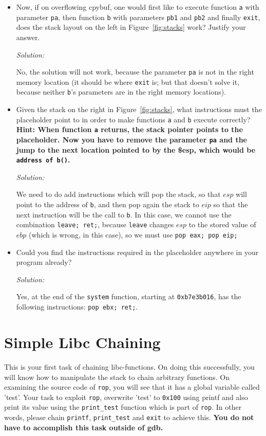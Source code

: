 \documentclass[a4paper,11pt]{article}
\newenvironment{solution}%
{\par{\noindent\small\textit{Solution:}}\vspace{-12pt}\begin{framed}}%
{\end{framed}\par}
\begin{document}
\begin {itemize}
\item Now, if on overflowing cpybuf, one would first like to execute function
\texttt{a} with parameter \texttt{pa}, then function \texttt{b} with
parameters \texttt{pb1} and \texttt{pb2}  and finally \texttt{exit}, does the
stack layout on the left in Figure~\ref{fig:stacks} work? Justify your answer.
\ifsolution\begin{solution}
No, the solution will not work, because the parameter \texttt{pa} is not in the right
memory location (it should be where \texttt{exit} is; but that doesn't solve it, because
neither \texttt{b}'s parameters are in the right memory locations).
\end{solution}\fi

\item Given the stack on the right in Figure~\ref{fig:stacks}, what instructions
  must the placeholder point to in order to make functions \texttt{a} and
  \texttt{b} execute correctly? \textbf{Hint: When function
    \texttt{a} returns, the stack pointer points to the placeholder. Now you have to
    remove the parameter \texttt{pa} and the jump to the next
    location pointed to by the \$esp, which would be \texttt{address of b()}.}
\ifsolution\begin{solution}
We need to do add instructions which will pop the stack, so that $esp$ will point to the address of
\texttt{b}, and then pop again the stack to $eip$ so that the next instruction will be the call to
\texttt{b}. In this case, we cannot use the combination \texttt{leave; ret;}, because \texttt{leave}
changes $esp$ to the stored value of $ebp$ (which is wrong, in this case), so we must use \texttt{pop eax; pop eip;}
\end{solution}\fi

\item Could you find the instructions required in the placeholder anywhere in your program already?
\ifsolution\begin{solution}
Yes, at the end of the \texttt{system} function, starting at \texttt{0xb7e3b016}, has the following instructions:
\texttt{pop ebx; ret;}.
\end{solution}\fi
\end{itemize}
\section*{Simple Libc Chaining}
This is your first task of chaining libc-functions. On doing this successfully,
you will know how to manipulate the stack to chain arbitrary functions. On
examining the source code of \texttt{rop}, you will see that it has a global
variable called 'test'. Your task to exploit \texttt{rop}, overwrite 'test' to
\texttt{0x100} using printf and also print its value using the
\texttt{print\_test} function which is part of \texttt{rop}. In other words,
please chain \texttt{printf}, \texttt{print\_test} and \texttt{exit} to achieve
this. \textbf{You do not have to accomplish this task outside of gdb.}
\end{document}
